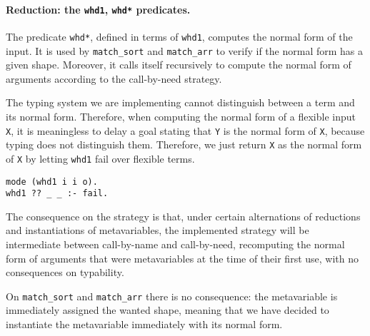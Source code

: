 \documentclass{easychair}
\begin{document}
\paragraph{Reduction: the \texttt{whd1}, \texttt{whd*} predicates.}
The predicate \verb+whd*+, defined in terms of \verb+whd1+, computes the normal form of the input. It is used by \verb+match_sort+ and \verb+match_arr+ to verify if the normal form has a given shape. Moreover, it calls itself recursively to compute the normal form of arguments according to the call-by-need strategy.

The typing system we are implementing cannot distinguish between a term and its normal form. Therefore, when computing the normal form of a flexible input \verb+X+, it is meaningless to delay a goal stating that \verb+Y+ is the normal form of \verb+X+, because typing does not distinguish them.
Therefore, we just return \verb+X+ as the normal form of \verb+X+ by letting \verb+whd1+ fail over flexible terms.
\begin{Verbatim}
mode (whd1 i i o).
whd1 ?? _ _ :- fail.
\end{Verbatim}

The consequence on the strategy is that, under certain alternations of reductions and instantiations of metavariables, the implemented strategy will be intermediate between call-by-name and call-by-need, recomputing the normal form of arguments that were metavariables at the time of their first use, with no consequences on typability.

On \verb+match_sort+ and \verb+match_arr+ there is no consequence: the metavariable is immediately assigned the wanted shape, meaning that we have decided to instantiate the metavariable immediately with its normal form.

%
%
%
\end{document}
